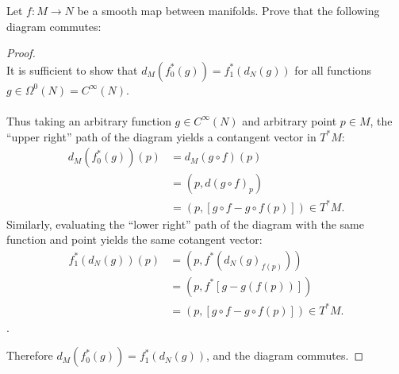 \documentclass{article}
\newenvironment{problem}[2][Problem]{\begin{trivlist}
\item[\hskip \labelsep {\bfseries #1}\hskip \labelsep {\bfseries #2.}]}{\end{trivlist}}
\begin{document}
\pagebreak

\begin{problem}{3}
  Let $f\colon M \rightarrow N$ be a smooth map between manifolds. Prove that
  the following diagram commutes:

  \centering{}


\end{problem}

\begin{proof} \text{} \\
  It is sufficient to show that $d_M(f^*_0(g)) = f^*_1(d_N(g))$ for all
  functions $g \in \Omega^0(N) = C^\infty(N)$.\\~\\
  Thus taking an arbitrary function $g \in C^\infty(N)$ and arbitrary point
  $p \in M$, the ``upper right'' path of the diagram yields a contangent vector
  in $T^*M$:
  \begin{align*}
    d_M(f^*_0(g))(p)
    &= d_M(g \circ f)(p) \\
    &= (p, d(g \circ f)_p) \\
    &= (p, [g \circ f - g \circ f(p)]) \in T^*M.
  \end{align*}
  Similarly, evaluating the ``lower right'' path of the diagram with the same
  function and point yields the same cotangent vector: \begin{align*}
    f^*_1(d_N(g))(p)
      &= (p, f^*(d_N(g)_{f(p)})) \\
      &= (p, f^*[g - g(f(p))]) \\
      &= (p, [g \circ f - g \circ f(p)]) \in T^*M.
  \end{align*}.

  Therefore $d_M(f^*_0(g)) = f^*_1(d_N(g))$, and the diagram commutes.
\end{proof}
\end{document}

